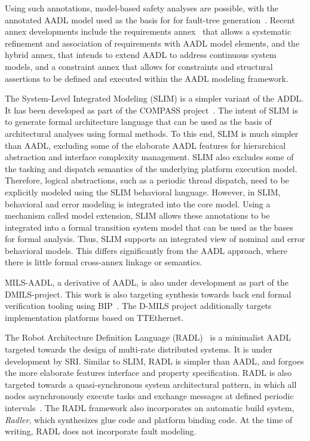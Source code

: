 Using such annotations, model-based safety analyses are possible, with the annotated AADL model used as the basis for for fault-tree generation~\cite{joshi2007automatic}. Recent annex developments include the requirements annex~\cite{blouin2011defining} that allows a systematic refinement and  association of requirements with AADL model elements, and the hybrid annex, that intends to  extend AADL to address continuous system
models, and a constraint annex that allows for constraints and structural assertions to be defined and executed  within the AADL modeling framework.

The System-Level Integrated Modeling (SLIM) is a simpler variant of the ADDL. It
has been developed as part of the COMPASS project~\cite{bozzano2009compass,gong2013automated}. The intent of SLIM is to generate
formal architecture language that can be used as the basis of architectural
analyses using formal methods. To this end, SLIM is much simpler than AADL,
excluding some of the elaborate AADL features for  hierarchical abstraction and
interface complexity management. SLIM also excludes some of the tasking and
dispatch semantics of the underlying platform execution model. Therefore,
logical abstractions, such as a periodic thread dispatch, need to be explicitly
modeled  using the SLIM behavioral language.  However, in SLIM,  behavioral and
error modeling is integrated into the core model. Using a mechanism called model
extension, SLIM allows these annotations to be integrated into a  formal
transition system model that can be used as the bases for formal analysis. Thus, SLIM supports an integrated view of nominal and error behavioral models.  This differs significantly from the AADL approach, where there is little  formal cross-annex linkage or semantics.

MILS-AADL, a derivative of AADL, is also under development as part of the DMILS-project\cite{dmils}.
This work is also targeting synthesis towards back end formal verification tooling using BIP~\cite{basu2011rigorous}. The D-MILS project additionally targets implementation platforms based on TTEthernet.

The Robot Architecture Definition Language (RADL)~\cite{li2014radl} is a minimalist  AADL targeted towards the design of multi-rate distributed systems. It is under development by SRI. Similar to SLIM, RADL is simpler than AADL, and forgoes the more elaborate features interface and property specification.  RADL is also targeted towards a quasi-synchronous system architectural pattern, in which all nodes asynchronously execute  tasks and exchange messages at defined periodic intervals~\cite{radl}. The RADL framework also incorporates an automatic build system, \emph{Radler}, which synthesizes glue code and platform binding code. At the time of writing, RADL does not incorporate fault  modeling.

